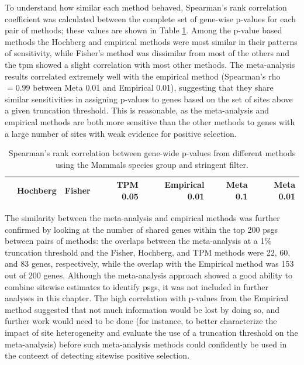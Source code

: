 To understand how similar each method behaved, Spearman's rank
correlation coefficient was calculated between the complete set of
gene-wise p-values for each pair of methods; these values are shown in
Table \ref{table_pval_corrs}. Among the p-value based methods the
Hochberg and empirical methods were most similar in their patterns of
sensitivity, while Fisher's method was dissimilar from most of the
others and the \ac{tpm} showed a slight correlation with most other
methods. The meta-analysis results correlated extremely well with the
empirical method (Spearman's rho$=0.99$ between Meta 0.01 and
Empirical 0.01), suggesting that they share similar sensitivities in
assigning p-values to genes based on the set of sites above a given
truncation threshold. This is reasonable, as the meta-analysis and
empirical methods are both more sensitive than the other methods to
genes with a large number of sites with weak evidence for positive
selection.

\begin{table}
\centering \scriptsize
\begin{tabular}{rrrrrrr}
\toprule
 & Hochberg & Fisher & TPM 0.05 & Empirical 0.01 & Meta 0.1 & Meta 0.01 \\

\midrule



\bottomrule
\end{tabular}
\caption{Spearman's rank correlation between gene-wide p-values from
  different methods using the Mammals species group and stringent
  filter.}
\label{table_pval_corrs}
\end{table}

The similarity between the meta-analysis and empirical methods was
further confirmed by looking at the number of shared genes within the
top 200 \acp{psg} between pairs of methods: the overlaps between the
meta-analysis at a 1\% truncation threshold and the Fisher, Hochberg,
and TPM methods were 22, 60, and 83 genes, respectively, while the
overlap with the Empirical method was 153 out of 200 genes. Although
the meta-analysis approach showed a good ability to combine sitewise
estimates to identify \acp{psg}, it was not included in further
analyses in this chapter. The high correlation with p-values from the
Empirical method suggested that not much information would be lost by
doing so, and further work would need to be done (for instance, to
better characterize the impact of site heterogeneity and evaluate the
use of a truncation threshold on the meta-analysis) before such
meta-analysis methods could confidently be used in the conteext of
detecting sitewise positive selection.  

